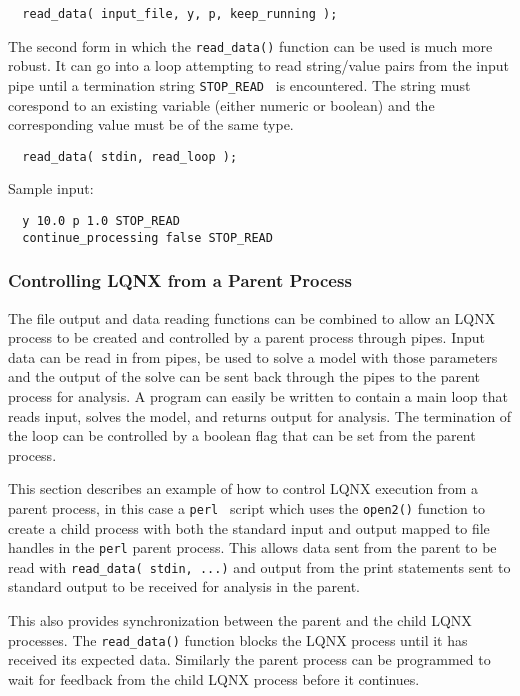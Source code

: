 \lstset{language=LQX}
\begin{lstlisting}
  read_data( input_file, y, p, keep_running );
\end{lstlisting}

The second form  in which the {\tt read\_data()} function can be used is much more robust. It can go into a loop
attempting to read string/value pairs from the input pipe until a termination string {\tt STOP\_READ } is encountered.
The string must corespond to an existing \ModLang variable (either numeric or boolean) and the corresponding
value must be of the same type.  

\lstset{language=LQX}
\begin{lstlisting}
  read_data( stdin, read_loop );
\end{lstlisting}

Sample input:

\lstset{language=C++}
\begin{lstlisting}
  y 10.0 p 1.0 STOP_READ
  continue_processing false STOP_READ
\end{lstlisting}

\subsubsection{Controlling LQNX from a Parent Process}

The file output and data reading functions can be combined to allow an LQNX process to be created and controlled
by a parent process through pipes. Input data can be read in from pipes, be used to solve a model with those
parameters and the output of the solve can be sent back through the pipes to the parent process for analysis.
A \ModLang program can easily be written to contain a main loop that reads input, solves the model, and returns
output for analysis. The termination of the loop can be controlled by a boolean flag that can be set from the
parent process.

This section describes an example of how to control LQNX execution from a parent process, in this case a {\tt perl }
script which uses the {\tt open2()} function to create a child process with both the standard input and output
mapped to file handles in the {\tt perl} parent process. This allows data sent from the parent to be read with
{\tt read\_data( stdin, ...)} and output from the \ModLang print statements sent to standard output to be received for
analysis in the parent.

This also provides synchronization between the parent and the child
LQNX processes. The {\tt read\_data()} function
blocks the LQNX process until it has received its expected data. Similarly the parent process can be programmed
to wait for feedback from the child LQNX process before it continues.

